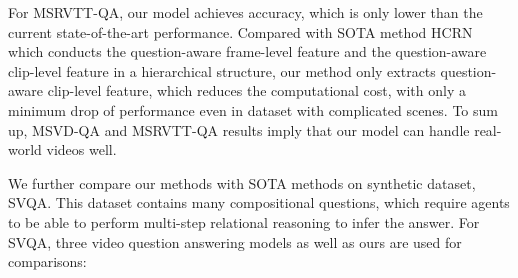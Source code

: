 \documentclass[journal]{IEEEtran}
\begin{document}
\begin{table*}[t]
    \centering
    \caption{Performance comparison to the state-of-the-art methods on SVQA.}
    \label{tab:SoTASVQA}
\end{table*}
For MSRVTT-QA, our model achieves  accuracy, which is only  lower than the current state-of-the-art performance. Compared with SOTA method HCRN which conducts the question-aware frame-level feature and the question-aware clip-level feature in a hierarchical structure, our method only extracts question-aware clip-level feature, which reduces the computational cost, with only a minimum drop of performance even in dataset with complicated scenes. To sum up, MSVD-QA and MSRVTT-QA results imply that our model can handle real-world videos well.

We further compare our methods with SOTA methods on synthetic dataset, SVQA. This dataset contains many compositional questions, which require agents to be able to perform multi-step relational reasoning to infer the answer. For SVQA, three video question answering models as well as ours are used for comparisons:
\end{document}
